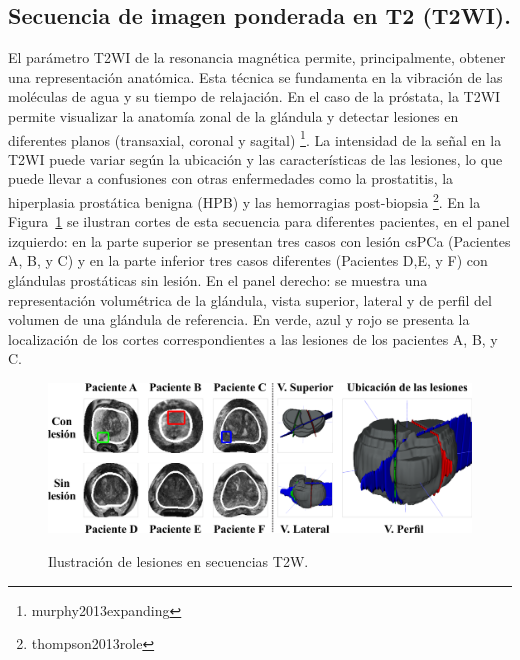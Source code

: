 \subsection{Secuencia de imagen ponderada en T2 (T2WI). }El parámetro T2WI de la resonancia magnética permite,  principalmente, obtener una representación anatómica. Esta técnica se fundamenta en la vibración de las moléculas de agua y su tiempo de relajación. En el caso de la próstata, la T2WI permite visualizar la anatomía zonal de la glándula y detectar lesiones en diferentes planos (transaxial, coronal y sagital) \footnote{murphy2013expanding}. La intensidad de la señal en la T2WI puede variar según la ubicación y las características de las lesiones, lo que puede llevar a confusiones con otras enfermedades como la prostatitis, la hiperplasia prostática benigna (HPB) y las hemorragias post-biopsia \footnote{thompson2013role}. En la 
Figura~\ref{fig:axT2W} se ilustran cortes de esta secuencia para diferentes pacientes, en el panel izquierdo: en la parte superior se presentan tres casos con lesión csPCa (Pacientes A, B, y C) y en la parte inferior tres casos diferentes (Pacientes D,E, y F) con glándulas prostáticas sin lesión. En el panel derecho: se muestra una representación 
volumétrica de la glándula, 
vista superior, lateral y de perfil del volumen de una glándula de referencia. En verde, azul y rojo se presenta la localización de los cortes correspondientes a las lesiones de los pacientes A, B, y C.\par


\begin{figure}[h!]
\centering
\caption{Ilustración de lesiones en secuencias T2W.}
\includegraphics[width=1\textwidth]{imgs/T2WSUMUP.png}
\label{fig:axT2W}
\end{figure}

